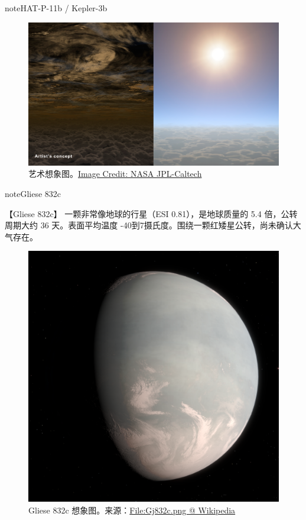 \documentclass[letterpaper,10pt,english]{sphinxmanual}
\begin{document}
\begin{notice}{note}{HAT-P-11b / Kepler-3b}
\begin{figure}[htbp]
\includegraphics{hat-p-11b-water.jpg}
\caption{艺术想象图。\href{http://www.nasa.gov/press/2014/september/nasa-telescopes-find-clear-skies-and-water-vapor-on-exoplanet/}{Image Credit: NASA JPL-Caltech}}\end{figure}
\end{notice}

\begin{notice}{note}{Gliese 832c}

【Gliese 832c】 一颗非常像地球的行星（ESI 0.81），是地球质量的 5.4 倍，公转周期大约 36 天。表面平均温度 -40到7摄氏度。围绕一颗红矮星公转，尚未确认大气存在。
\begin{figure}[htbp]
\centering
\capstart

\includegraphics{Gj832c.png}
\caption{Gliese 832c 想象图。来源：\href{https://en.wikipedia.org/wiki/File:Gj832c.png}{File:Gj832c.png @ Wikipedia}}\end{figure}
\end{notice}
\end{document}

